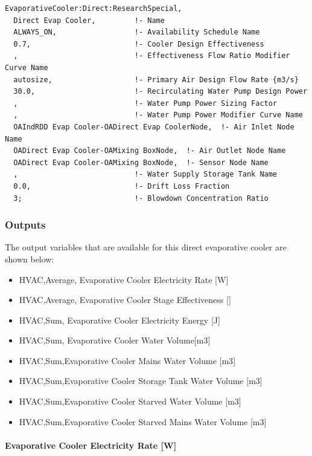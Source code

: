 \begin{lstlisting}
EvaporativeCooler:Direct:ResearchSpecial,
  Direct Evap Cooler,         !- Name
  ALWAYS_ON,                  !- Availability Schedule Name
  0.7,                        !- Cooler Design Effectiveness
  ,                           !- Effectiveness Flow Ratio Modifier Curve Name
  autosize,                   !- Primary Air Design Flow Rate {m3/s}
  30.0,                       !- Recirculating Water Pump Design Power
  ,                           !- Water Pump Power Sizing Factor
  ,                           !- Water Pump Power Modifier Curve Name
  OAIndRDD Evap Cooler-OADirect Evap CoolerNode,  !- Air Inlet Node Name
  OADirect Evap Cooler-OAMixing BoxNode,  !- Air Outlet Node Name
  OADirect Evap Cooler-OAMixing BoxNode,  !- Sensor Node Name
  ,                           !- Water Supply Storage Tank Name
  0.0,                        !- Drift Loss Fraction
  3;                          !- Blowdown Concentration Ratio
\end{lstlisting}

\subsubsection{Outputs}\label{outputs-1-009}

The output variables that are available for this direct evaporative cooler are shown below:

\begin{itemize}
\item
  HVAC,Average, Evaporative Cooler Electricity Rate {[}W{]}
\item
  HVAC,Average, Evaporative Cooler Stage Effectiveness {[]}
\item
  HVAC,Sum, Evaporative Cooler Electricity Energy {[}J{]}
\item
  HVAC,Sum, Evaporative Cooler Water Volume{[}m3{]}
\item
  HVAC,Sum,Evaporative Cooler Mains Water Volume {[}m3{]}
\item
  HVAC,Sum,Evaporative Cooler Storage Tank Water Volume {[}m3{]}
\item
  HVAC,Sum,Evaporative Cooler Starved Water Volume {[}m3{]}
\item
  HVAC,Sum,Evaporative Cooler Starved Mains Water Volume {[}m3{]}
\end{itemize}

\paragraph{Evaporative Cooler Electricity Rate {[}W{]}}\label{evaporative-cooler-electric-powerw-1}

